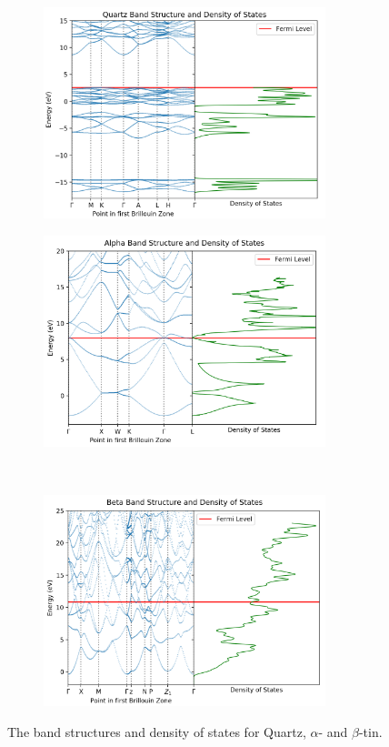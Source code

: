 \documentclass[12pt]{article}
\begin{document}
\begin{figure}[h!!!!!]
	\centering
	\begin{subfigure}[t]{0.5\textwidth}
		\includegraphics[width=8.2cm]{quartz-dos-data/quartz-band-dos.png}
		\label{fig:quartz-band-dos}
	\end{subfigure}%
	\begin{subfigure}[t]{0.5\textwidth}
		\includegraphics[width=8.2cm]{alpha-dos-data/alpha-bands-dos.png}
		\label{fig:alpha-band-dos}
	\end{subfigure}%
	\\
	\begin{subfigure}[t]{0.5\textwidth}
		\includegraphics[width=8.2cm]{beta-dos-data/beta-bands-dos.png}
		\label{fig:beta-band-dos}
	\end{subfigure}
	\caption{The band structures and density of states for Quartz, $\alpha$- and $\beta$-tin.}
	\label{fig:banddos}
\end{figure}
\end{document}
